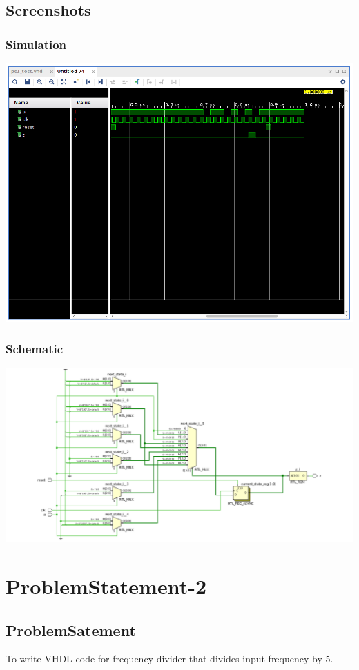 \documentclass[12pt]{article}
\begin{document}
  \subsection{Screenshots}
  \subsubsection{Simulation} 
	\includegraphics[width=\linewidth]{lab10_ps1b.png}
	\subsubsection{Schematic} 
	\includegraphics[width=\linewidth]{lab10_ps1.png}
\newpage
  \section{ProblemStatement-2}
  \subsection{ProblemSatement}
    To write VHDL code for frequency divider that divides input frequency by 5.
\end{document}
